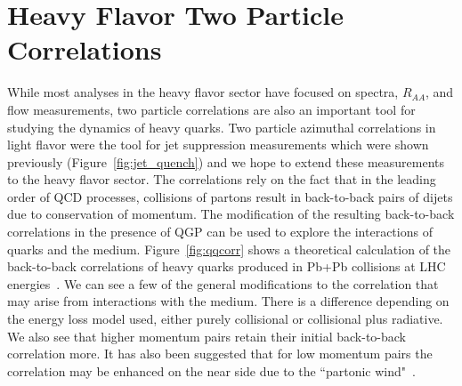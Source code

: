 \section{Heavy Flavor Two Particle Correlations}

While most analyses in the heavy flavor sector have focused on spectra, $R_{AA}$, and flow measurements, two particle correlations are also an important tool for studying the dynamics of heavy quarks. Two particle azimuthal correlations in light flavor were the tool for jet suppression measurements which were shown previously (Figure~\ref{fig:jet_quench}) and we hope to extend these measurements to the heavy flavor sector. The correlations rely on the fact that in the leading order of QCD processes, collisions of partons result in back-to-back pairs of dijets due to conservation of momentum. The modification of the resulting back-to-back correlations in the presence of QGP can be used to explore the interactions of quarks and the medium. Figure~\ref{fig:qqcorr} shows a theoretical calculation of the back-to-back correlations of heavy quarks produced in Pb+Pb collisions at LHC energies~\cite{qqazi}. We can see a few of the general modifications to the correlation that may arise from interactions with the medium. There is a difference depending on the energy loss model used, either purely collisional or collisional plus radiative. We also see that higher momentum pairs retain their initial back-to-back correlation more. It has also been suggested that for low momentum pairs the correlation may be enhanced on the near side due to the ``partonic wind"~\cite{partwind}.

